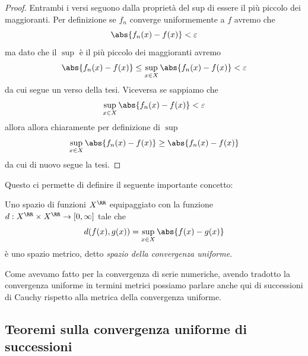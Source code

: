 \documentclass[11pt]{scrartcl}
\begin{document}
	\begin{proof}
		Entrambi i versi seguono dalla proprietà del sup di essere il più piccolo dei maggioranti. Per definizione se $f_n$ converge uniformemente a $f$ avremo che
		$$\abs{f_n(x)-f(x)}<\varepsilon$$
		ma dato che il $\sup$ è il più piccolo dei maggioranti avremo
		$$\abs{f_n(x)-f(x)}\le \sup_{x\in X}\abs{f_n(x)-f(x)}<\varepsilon$$
		da cui segue un verso della tesi. Viceversa se sappiamo che
		$$\sup_{x\in X}\abs{f_n(x)-f(x)}<\varepsilon$$
		allora allora chiaramente per definizione di $\sup$
		$$\sup_{x\in X}\abs{f_n(x)-f(x)}\ge \abs{f_n(x)-f(x)}$$
		da cui di nuovo segue la tesi. 
	\end{proof}
	Questo ci permette di definire il seguente importante concetto:
	\begin{definition}
		Uno spazio di funzioni $X^\RR$ equipaggiato con la funzione $d:X^\RR\times X^\RR\to\left[0,\infty\right]$
		tale che
		$$d(f(x),g(x))=\sup_{x\in X}\abs{f(x)-g(x)}$$
		è uno spazio metrico, detto \textit{spazio della convergenza uniforme}. 
	\end{definition}
	Come avevamo fatto per la convergenza di serie numeriche, avendo tradotto la convergenza uniforme in termini metrici possiamo parlare anche qui di successioni di Cauchy rispetto alla metrica della convergenza uniforme.
	\subsection{Teoremi sulla convergenza uniforme di successioni}
	
\end{document}
